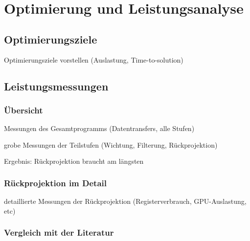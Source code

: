\chapter{Optimierung und Leistungsanalyse}

\section{Optimierungsziele}

Optimierungsziele vorstellen (Auslastung, Time-to-solution)

\section{Leistungsmessungen}

\subsection{Übersicht}

Messungen des Gesamtprogramms (Datentransfers, alle Stufen)

grobe Messungen der Teilstufen (Wichtung, Filterung, Rückprojektion)

Ergebnis: Rückprojektion braucht am längsten

\subsection{Rückprojektion im Detail}

detaillierte Messungen der Rückprojektion (Registerverbrauch, GPU-Auslastung, etc)

\subsection{Vergleich mit der Literatur}
